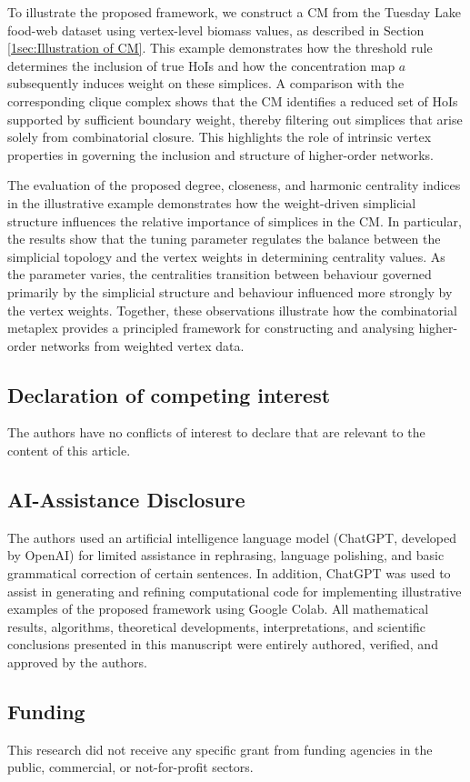 \documentclass[12pt]{article}
\theoremstyle{normalhead_nobrackets}
\theoremstyle{exampstyle}
\begin{document}
To illustrate the proposed framework, we construct a CM from the Tuesday Lake food-web dataset using vertex-level biomass values, as described in Section \ref{1sec:Illustration of CM}. This example demonstrates how the threshold rule determines the inclusion of true HoIs and how the concentration map $a$ subsequently induces weight on these simplices. A comparison with the corresponding clique complex shows that the CM identifies a reduced set of HoIs supported by sufficient boundary weight, thereby filtering out simplices that arise solely from combinatorial closure. This highlights the role of intrinsic vertex properties in governing the inclusion and structure of higher-order networks.

The evaluation of the proposed degree, closeness, and harmonic centrality indices in the illustrative example demonstrates how the weight-driven simplicial structure influences the relative importance of simplices in the CM. In particular, the results show that the tuning parameter regulates the balance between the simplicial topology and the vertex weights in determining centrality values. As the parameter varies, the centralities transition between behaviour governed primarily by the simplicial structure and behaviour influenced more strongly by the vertex weights. Together, these observations illustrate how the combinatorial metaplex provides a principled framework for constructing and analysing higher-order networks from weighted vertex data.

\subsection*{Declaration of competing interest}

The authors have no conflicts of interest to declare that are relevant to the content of this article.

\subsection*{AI-Assistance Disclosure}

The authors used an artificial intelligence language model (ChatGPT, developed by OpenAI) for limited assistance in rephrasing, language polishing, and basic grammatical correction of certain sentences. In addition, ChatGPT was used to assist in generating and refining computational code for implementing illustrative examples of the proposed framework using Google Colab. All mathematical results, algorithms, theoretical developments, interpretations, and scientific conclusions presented in this manuscript were entirely authored, verified, and approved by the authors.

\subsection*{Funding}

This research did not receive any specific grant from funding agencies in the public, commercial, or not-for-profit sectors.
\begin{sloppypar}
 \printbibliography   
\end{sloppypar}
\end{document}
